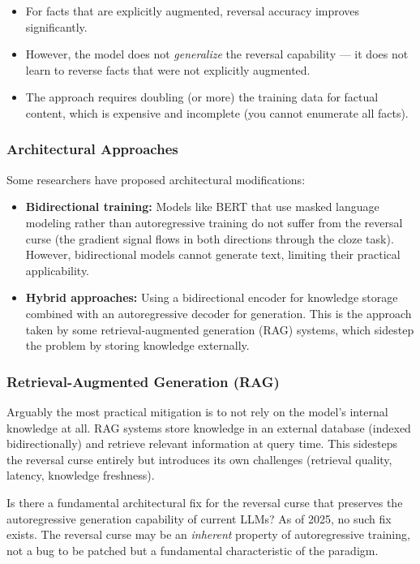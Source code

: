 \documentclass[11pt, a4paper]{article}
\theoremstyle{definition}
\theoremstyle{plain}
\begin{document}
\begin{itemize}[leftmargin=2em]
  \item For facts that are explicitly augmented, reversal accuracy
    improves significantly.
  \item However, the model does not \emph{generalize} the reversal
    capability --- it does not learn to reverse facts that were not
    explicitly augmented.
  \item The approach requires doubling (or more) the training data for
    factual content, which is expensive and incomplete (you cannot
    enumerate all facts).
\end{itemize}

\subsubsection{Architectural Approaches}

Some researchers have proposed architectural modifications:

\begin{itemize}[leftmargin=2em]
  \item \textbf{Bidirectional training:} Models like BERT that use
    masked language modeling rather than autoregressive training do not
    suffer from the reversal curse (the gradient signal flows in both
    directions through the cloze task).  However, bidirectional models
    cannot generate text, limiting their practical applicability.
  \item \textbf{Hybrid approaches:} Using a bidirectional encoder for
    knowledge storage combined with an autoregressive decoder for
    generation.  This is the approach taken by some retrieval-augmented
    generation (RAG) systems, which sidestep the problem by storing
    knowledge externally.
\end{itemize}

\subsubsection{Retrieval-Augmented Generation (RAG)}

Arguably the most practical mitigation is to not rely on the model's
internal knowledge at all.  RAG systems store knowledge in an external
database (indexed bidirectionally) and retrieve relevant information at
query time.  This sidesteps the reversal curse entirely but introduces
its own challenges (retrieval quality, latency, knowledge freshness).

\begin{openquestion}
Is there a fundamental architectural fix for the reversal curse that
preserves the autoregressive generation capability of current LLMs?
As of 2025, no such fix exists.  The reversal curse may be an
\emph{inherent} property of autoregressive training, not a bug to be
patched but a fundamental characteristic of the paradigm.
\end{openquestion}
\end{document}
